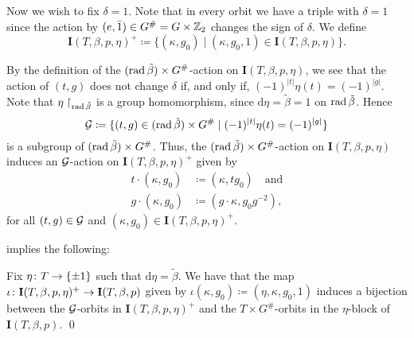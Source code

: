 Now we wish to fix $\delta = 1$.
Note that in every orbit we have a triple with $\delta = 1$ since the action by $(e, \bar1) \in G^\# = G \times \mathbb{Z}_2$ changes the sign of $\delta$.
We define
\[
	\mathbf{I}(T, \beta, p, \eta)^+ \coloneqq \{ (\kappa, g_0) \mid (\kappa, g_0, 1) \in \mathbf{I}(T, \beta, p, \eta)\}.
\]

By the definition of the $(\operatorname{rad} \tilde\beta) \times G^\#$-action on $\mathbf{I}(T, \beta, p, \eta)$, we see that the action of $(t,g)$ does not change $\delta$ if, and only if, $
	(-1)^{|t|}\eta(t) = (-1)^{|g|}.
$
Note that $\eta\restriction_{\operatorname{rad} \tilde\beta}$ is a group homomorphism, since $\mathrm{d}\eta = \tilde\beta = 1$ on $\operatorname{rad} \tilde\beta$.
Hence
\[\label{eq:mathcal-G}
	\mathcal G \coloneqq \{ (t,g) \in (\operatorname{rad} \tilde\beta) \times G^\# \mid (-1)^{|t|}\eta(t) = (-1)^{|g|} \}
\]
is a subgroup of $(\operatorname{rad} \tilde\beta) \times G^\#$.
Thus, the $(\operatorname{rad} \tilde\beta) \times G^\#$-action on $\mathbf{I}(T, \beta, p, \eta)$ induces an $\mathcal G$-action on $\mathbf{I}(T, \beta, p, \eta)^+$ given by
\begin{align}
	t \cdot (\kappa, g_0) & \coloneqq (\kappa, t g_0)
	\quad \text{and}                                               \\
	g \cdot (\kappa, g_0) & \coloneqq (g\cdot \kappa, g_0 g^{-2}),
\end{align}
for all $(t, g)\in \mathcal G$ and $(\kappa, g_0) \in \mathbf{I}(T, \beta, p, \eta)^+$. 

 implies the following:

\begin{prop}\label{prop:after-fixing-delta}
	Fix $\eta\colon T \to \{ \pm 1 \}$ such that $\mathrm{d}\eta = \tilde\beta$.
	We have that the map $\iota\colon \mathbf{I}(T,\beta,p,\eta)^+ \to \mathbf{I}(T,\beta,p)$ given by $\iota(\kappa, g_0) \coloneqq (\eta,\kappa, g_0, 1)$ induces a bijection between the $\mathcal G$-orbits in $\mathbf{I}(T,\beta,p,\eta)^+$ and the $T\times G^\#$-orbits in the $\eta$-block of $\mathbf{I}(T,\beta,p)$. \qed
\end{prop}


